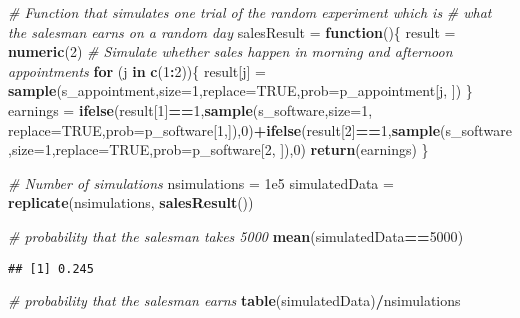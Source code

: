 \documentclass[
]{article}
\newenvironment{Shaded}{\begin{snugshade}}{\end{snugshade}}
\newcommand{\AttributeTok}[1]{\textcolor[rgb]{0.13,0.29,0.53}{#1}}
\newcommand{\CommentTok}[1]{\textcolor[rgb]{0.56,0.35,0.01}{\textit{#1}}}
\newcommand{\ConstantTok}[1]{\textcolor[rgb]{0.56,0.35,0.01}{#1}}
\newcommand{\ControlFlowTok}[1]{\textcolor[rgb]{0.13,0.29,0.53}{\textbf{#1}}}
\newcommand{\DecValTok}[1]{\textcolor[rgb]{0.00,0.00,0.81}{#1}}
\newcommand{\FloatTok}[1]{\textcolor[rgb]{0.00,0.00,0.81}{#1}}
\newcommand{\FunctionTok}[1]{\textcolor[rgb]{0.13,0.29,0.53}{\textbf{#1}}}
\newcommand{\NormalTok}[1]{#1}
\newcommand{\OtherTok}[1]{\textcolor[rgb]{0.56,0.35,0.01}{#1}}
\newcommand{\SpecialCharTok}[1]{\textcolor[rgb]{0.81,0.36,0.00}{\textbf{#1}}}
\begin{document}
\begin{Shaded}
\begin{Highlighting}[]
\CommentTok{\# Function that simulates one trial of the random experiment which is}
\CommentTok{\# what the salesman earns on a random day}
\NormalTok{salesResult }\OtherTok{=} \ControlFlowTok{function}\NormalTok{()\{}
\NormalTok{  result }\OtherTok{=} \FunctionTok{numeric}\NormalTok{(}\DecValTok{2}\NormalTok{)}
  \CommentTok{\# Simulate whether sales happen in morning and afternoon appointments}
  \ControlFlowTok{for}\NormalTok{ (j }\ControlFlowTok{in} \FunctionTok{c}\NormalTok{(}\DecValTok{1}\SpecialCharTok{:}\DecValTok{2}\NormalTok{))\{}
\NormalTok{    result[j] }\OtherTok{=} \FunctionTok{sample}\NormalTok{(s\_appointment,}\AttributeTok{size=}\DecValTok{1}\NormalTok{,}\AttributeTok{replace=}\ConstantTok{TRUE}\NormalTok{,}\AttributeTok{prob=}\NormalTok{p\_appointment[j, ])}
\NormalTok{  \}}
\NormalTok{  earnings }\OtherTok{=} \FunctionTok{ifelse}\NormalTok{(result[}\DecValTok{1}\NormalTok{]}\SpecialCharTok{==}\DecValTok{1}\NormalTok{,}\FunctionTok{sample}\NormalTok{(s\_software,}\AttributeTok{size=}\DecValTok{1}\NormalTok{, }\AttributeTok{replace=}\ConstantTok{TRUE}\NormalTok{,}\AttributeTok{prob=}\NormalTok{p\_software[}\DecValTok{1}\NormalTok{,]),}\DecValTok{0}\NormalTok{)}\SpecialCharTok{+}\FunctionTok{ifelse}\NormalTok{(result[}\DecValTok{2}\NormalTok{]}\SpecialCharTok{==}\DecValTok{1}\NormalTok{,}\FunctionTok{sample}\NormalTok{(s\_software,}\AttributeTok{size=}\DecValTok{1}\NormalTok{,}\AttributeTok{replace=}\ConstantTok{TRUE}\NormalTok{,}\AttributeTok{prob=}\NormalTok{p\_software[}\DecValTok{2}\NormalTok{, ]),}\DecValTok{0}\NormalTok{)}
  \FunctionTok{return}\NormalTok{(earnings)}
\NormalTok{\}}

\CommentTok{\# Number of simulations}
\NormalTok{nsimulations }\OtherTok{=} \FloatTok{1e5}
\NormalTok{simulatedData }\OtherTok{=} \FunctionTok{replicate}\NormalTok{(nsimulations, }\FunctionTok{salesResult}\NormalTok{())}

\CommentTok{\# probability that the salesman takes 5000}
\FunctionTok{mean}\NormalTok{(simulatedData}\SpecialCharTok{==}\DecValTok{5000}\NormalTok{)}
\end{Highlighting}
\end{Shaded}

\begin{verbatim}
## [1] 0.245
\end{verbatim}

\begin{Shaded}
\begin{Highlighting}[]
\CommentTok{\# probability that  the salesman earns}
\FunctionTok{table}\NormalTok{(simulatedData)}\SpecialCharTok{/}\NormalTok{nsimulations}
\end{Highlighting}
\end{Shaded}
\end{document}
